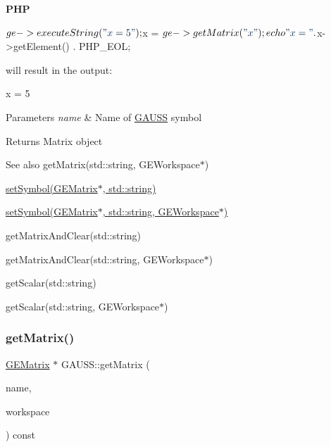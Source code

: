 {\bfseries P\+HP} 
\begin{DoxyCode}
$ge->executeString(\textcolor{stringliteral}{"x = 5"});
$x = $ge->getMatrix(\textcolor{stringliteral}{"x"});
echo \textcolor{stringliteral}{"x = "} . $x->getElement() . PHP\_EOL;
\end{DoxyCode}
 will result in the output\+: 
\begin{DoxyCode}
x = 5
\end{DoxyCode}



\begin{DoxyParams}{Parameters}
{\em name} & Name of \hyperlink{class_g_a_u_s_s}{G\+A\+U\+SS} symbol \\
\hline
\end{DoxyParams}
\begin{DoxyReturn}{Returns}
Matrix object
\end{DoxyReturn}
\begin{DoxySeeAlso}{See also}
get\+Matrix(std\+::string, G\+E\+Workspace$\ast$) 

\hyperlink{class_g_a_u_s_s_ab51cbcd5a66ba3355f52bf10bf31f7e3}{set\+Symbol(\+G\+E\+Matrix$\ast$, std\+::string)} 

\hyperlink{class_g_a_u_s_s_a23181c31041882ce839f816ce56e1231}{set\+Symbol(\+G\+E\+Matrix$\ast$, std\+::string, G\+E\+Workspace$\ast$)} 

get\+Matrix\+And\+Clear(std\+::string) 

get\+Matrix\+And\+Clear(std\+::string, G\+E\+Workspace$\ast$) 

get\+Scalar(std\+::string) 

get\+Scalar(std\+::string, G\+E\+Workspace$\ast$) 
\end{DoxySeeAlso}
\mbox{\label{class_g_a_u_s_s_a1345134e60c448c96d166049b71ce4a2}} 
\subsubsection{\texorpdfstring{get\+Matrix()}{getMatrix()}\hspace{0.1cm}{\footnotesize\ttfamily [2/2]}}
{\footnotesize\ttfamily \hyperlink{class_g_e_matrix}{G\+E\+Matrix} $\ast$ G\+A\+U\+S\+S\+::get\+Matrix (\begin{DoxyParamCaption}\item[{std\+::string}]{name,  }\item[{\hyperlink{class_g_e_workspace}{G\+E\+Workspace} $\ast$}]{workspace }\end{DoxyParamCaption}) const}



